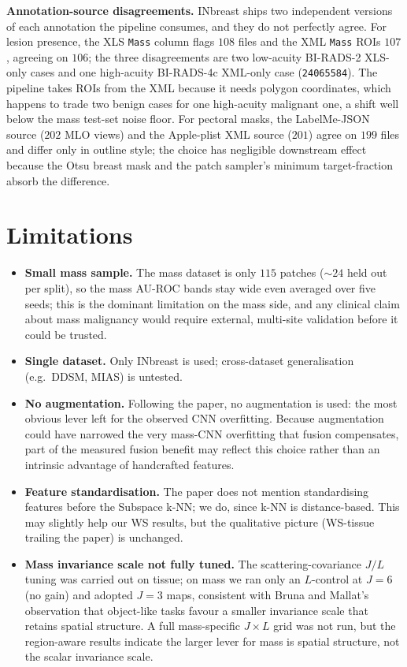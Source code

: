 \textbf{Annotation-source disagreements.} \label{sec:annot_audit} INbreast ships two
independent versions of each annotation the pipeline consumes, and they do not perfectly
agree. For lesion presence, the XLS \texttt{Mass} column flags $108$ files and the XML
\texttt{Mass} ROIs $107$, agreeing on $106$; the three disagreements are two low-acuity
BI-RADS-2 XLS-only cases and one high-acuity BI-RADS-4c XML-only case (\texttt{24065584}).
The pipeline takes ROIs from the XML because it needs polygon coordinates, which happens to
trade two benign cases for one high-acuity malignant one, a shift well below the mass
test-set noise floor. For pectoral masks, the
LabelMe-JSON source ($202$ MLO views) and the Apple-plist XML source ($201$) agree on $199$
files and differ only in outline style; the choice has negligible downstream effect because
the Otsu breast mask and the patch sampler's minimum target-fraction absorb the difference.

\section{Limitations}

\begin{itemize}
    \item \textbf{Small mass sample.} The mass dataset is only $115$ patches (${\sim}24$ held
    out per split), so the mass AU-ROC bands stay wide even averaged over five seeds; this is
    the dominant limitation on the mass side, and any clinical claim about mass malignancy
    would require external, multi-site validation before it could be trusted.
    \item \textbf{Single dataset.} Only INbreast is used; cross-dataset generalisation (e.g.\
    DDSM, MIAS) is untested.
    \item \textbf{No augmentation.} Following the paper, no augmentation is used: the most
    obvious lever left for the observed CNN overfitting. Because augmentation could have narrowed
    the very mass-CNN overfitting that fusion compensates, part of the measured fusion benefit
    may reflect this choice rather than an intrinsic advantage of handcrafted features.
    \item \textbf{Feature standardisation.} The paper does not mention standardising features
    before the Subspace k-NN; we do, since k-NN is distance-based. This may slightly help our
    WS results, but the qualitative picture (WS-tissue trailing the paper) is unchanged.
    \item \textbf{Mass invariance scale not fully tuned.} The scattering-covariance $J/L$
    tuning was carried out on tissue; on mass we ran only an $L$-control at $J=6$ (no gain)
    and adopted $J=3$ maps, consistent with Bruna and Mallat's \cite{bruna2013invariant}
    observation that object-like tasks favour a smaller invariance scale that retains spatial
    structure. A full mass-specific $J\times L$ grid was not run, but the region-aware results
    indicate the larger lever for mass is spatial structure, not the scalar invariance scale.
\end{itemize}
